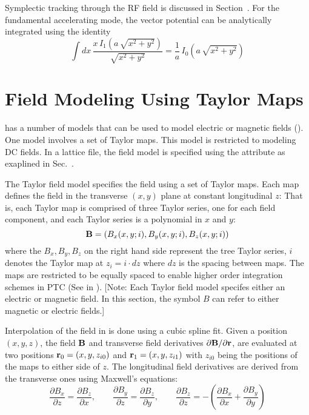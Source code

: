 Symplectic tracking through the RF field is discussed in Section~.  For the
fundamental accelerating mode, the vector potential can be analytically integrated using the
identity
\begin{equation}
  \int dx \,\frac{x \, I_1 (a \, \sqrt{x^2+y^2})}{\sqrt{x^2+y^2}}  = 
  \frac{1}{a} \, I_0 (a \, \sqrt{x^2+y^2})
\end{equation}

\section{Field Modeling Using Taylor Maps}
\label{s:taylor.field.phys}

\bmad has a number of  models that can be used to model electric or magnetic fields
(). One model involves a set of Taylor maps. This model is restricted to modeling
DC fields. In a lattice file, the  field model is specified using the 
attribute as exaplined in Sec.~.

The Taylor field model specifies the field using a set of Taylor maps. Each map defines the field in
the transverse $(x, y)$ plane at constant longitudinal $z$: That is, each Taylor map is comprised of
three Taylor series, one for each field component, and each Taylor series is a polynomial in $x$ and
$y$:
\begin{equation}
  {\bf B} = (B_x(x,y;i), B_y(x,y;i), B_z(x,y;i))
\end{equation}
where the $B_x, B_y, B_z$ on the right hand side represent the tree Taylor series, $i$
denotes the Taylor map at $z_i = i \cdot dz$ where $dz$ is the spacing between maps. The
maps are restricted to be equally spaced to enable higher order integration schemes in PTC
(See  in ).  [Note: Each Taylor field model
specifes either an electric or magnetic field. In this section, the symbol $B$ can refer
to either magnetic or electric fields.]

Interpolation of the field in \bmad is done using a cubic spline fit. Given a position
$(x, y, z)$, the field ${\bf B}$ and transverse field derivatives $\partial {\bf B} / \partial
{\bf r}$, are evaluated at two positions ${\bf r}_0 = (x, y, z_{i0})$ and ${\bf r}_1 = (x, y,
z_{i1})$ with $z_{i0}$ being the positions of the maps to either side of $z$.
The longitudinal field derivatives are derived from the transverse ones using Maxwell's equations:
\begin{equation}
  \frac{\partial B_x}{\partial z} = \frac{\partial B_z}{\partial x}, \qquad
  \frac{\partial B_y}{\partial z} = \frac{\partial B_z}{\partial y}, \qquad
  \frac{\partial B_z}{\partial z} = 
    - \left( \frac{\partial B_x}{\partial x} + \frac{\partial B_y}{\partial y} \right)
\end{equation}

